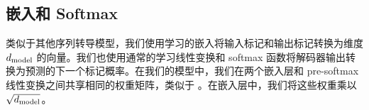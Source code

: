 

\subsection{嵌入和 Softmax}
类似于其他序列转导模型，我们使用学习的嵌入将输入标记和输出标记转换为维度 $d_{\text{model}}$ 的向量。我们也使用通常的学习线性变换和 softmax 函数将解码器输出转换为预测的下一个标记概率。在我们的模型中，我们在两个嵌入层和 pre-softmax 线性变换之间共享相同的权重矩阵，类似于 \citep{press2016using}。在嵌入层中，我们将这些权重乘以 $\sqrt{d_{\text{model}}}$。


